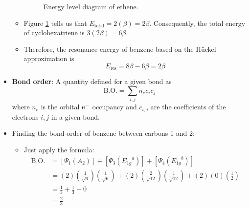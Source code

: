 \documentclass[../notes.tex]{subfiles}
\begin{document}
\begin{itemize}
\begin{itemize}
\begin{figure}[h!]
            \caption{Energy level diagram of ethene.}
            \label{fig:etheneMOdiagram}
        \end{figure}
        \item Figure \ref{fig:etheneMOdiagram} tells us that $E_\text{total}=2(\beta)=2\beta$. Consequently, the total energy of cyclohexatriene is $3(2\beta)=6\beta$.
        \item Therefore, the resonance energy of benzene based on the H\"{u}ckel approximation is
        \begin{equation*}
            E_\text{res} = 8\beta-6\beta = 2\beta
        \end{equation*}
    \end{itemize}
    \item \textbf{Bond order}: A quantity defined for a given bond as
    \begin{equation*}
        \text{B.O.} = \sum_{i,j}n_ec_ic_j
    \end{equation*}
    where $n_e$ is the orbital $\e[-]$ occupancy and $c_{i,j}$ are the coefficients of the electrons $i,j$ in a given bond.
    \item Finding the bond order of benzene between carbons 1 and 2:
    \begin{itemize}
        \item Just apply the formula:
        \begin{align*}
            \text{B.O.} &= [\Psi_1(A_2)]+[\Psi_3({E_{1g}}^a)]+[\Psi_4({E_{1g}}^b)]\\
            &= (2)\left( \frac{1}{\sqrt{6}} \right)\left( \frac{1}{\sqrt{6}} \right)+(2)\left( \frac{2}{\sqrt{12}} \right)\left( \frac{1}{\sqrt{12}} \right)+(2)(0)\left( \frac{1}{2} \right)\\
            &= \frac{1}{3}+\frac{1}{3}+0\\
            &= \frac{2}{3}
        \end{align*}
    \end{itemize}
\end{itemize}
\end{document}
